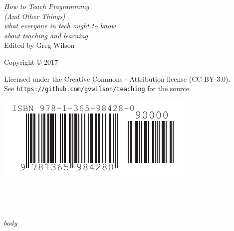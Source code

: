 \documentclass[10pt,statementpaper]{memoir}
\begin{document}
\pagestyle{empty}

{\begingroup
  \raggedleft
  \vspace*{\baselineskip}

  {\Huge\itshape How to Teach Programming \\ (And Other Things)}\\[\baselineskip]

  {\large\itshape
    what everyone in tech ought to know\\ about teaching and learning
  }\\[0.2\textheight]

  {\large Edited by Greg Wilson}\par

  \vfill

  {\large Copyright {\copyright} 2017}

  \vspace*{\baselineskip}

  {\small
    Licensed under the Creative Commons - Attribution license (CC-BY-3.0).
    \\
    See \texttt{https://github.com/gvwilson/teaching} for the source.
  }

  \vspace*{4\baselineskip}

  \includegraphics{isbn-barcode.pdf}

\endgroup}

\newpage

\pagestyle{empty}

~

\newpage

\tableofcontents

\newpage

\pagestyle{empty}

~

\newpage

\pagestyle{plain}

$body$
\end{document}
